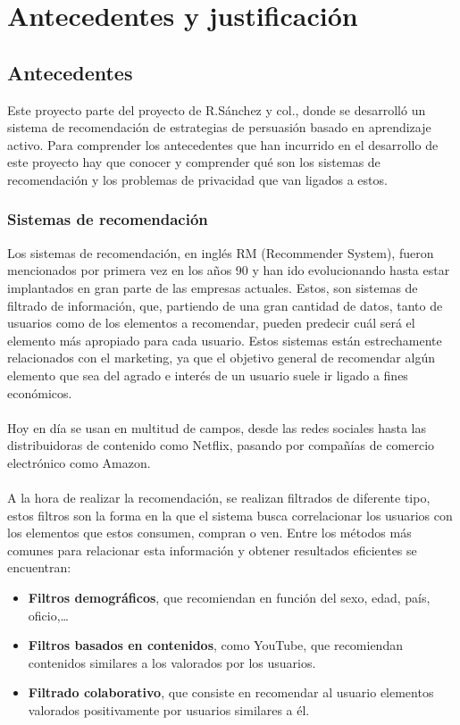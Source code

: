 \chapter{Antecedentes y justificación}
\thispagestyle{fancy}

\section{Antecedentes}
Este proyecto parte del proyecto de R.Sánchez y col.\autocite{sanchez-corcueraPersuasionbasedRecommenderSystem2020}, donde se desarrolló un sistema de recomendación de estrategias de persuasión basado en aprendizaje activo. Para comprender los antecedentes que han incurrido en el desarrollo de este proyecto hay que conocer y comprender qué son los sistemas de recomendación y los problemas de privacidad que van ligados a estos. 
\subsection{Sistemas de recomendación}
Los sistemas de recomendación, en inglés RM (Recommender System), fueron mencionados por primera vez en los años 90 y han ido evolucionando hasta estar implantados en gran parte de las empresas actuales. Estos, son sistemas de filtrado de información, que, partiendo de una gran cantidad de datos, tanto de usuarios como de los elementos a recomendar, pueden predecir cuál será el elemento más apropiado para cada usuario. Estos sistemas están estrechamente relacionados con el marketing, ya que el objetivo general de recomendar algún elemento que sea del agrado e interés de un usuario suele ir ligado a fines económicos.
\\ \\
Hoy en día se usan en multitud de campos, desde las redes sociales hasta las distribuidoras de contenido como Netflix, pasando por compañías de comercio electrónico como Amazon. 
\\ \\
A la hora de realizar la recomendación, se realizan filtrados de diferente tipo, estos filtros son la forma en la que el sistema busca correlacionar los usuarios con los elementos que estos consumen, compran o ven. Entre los métodos más comunes para relacionar esta información y obtener resultados eficientes se encuentran:
\begin{itemize}
    \item \textbf{Filtros demográficos}, que recomiendan en función del sexo, edad, país, oficio,… 
    \item \textbf{Filtros basados en contenidos}, como YouTube, que recomiendan contenidos similares a los valorados por los usuarios. 
    \item \textbf{Filtrado colaborativo}, que consiste en recomendar al usuario elementos valorados positivamente por usuarios similares a él. 
\end{itemize}

